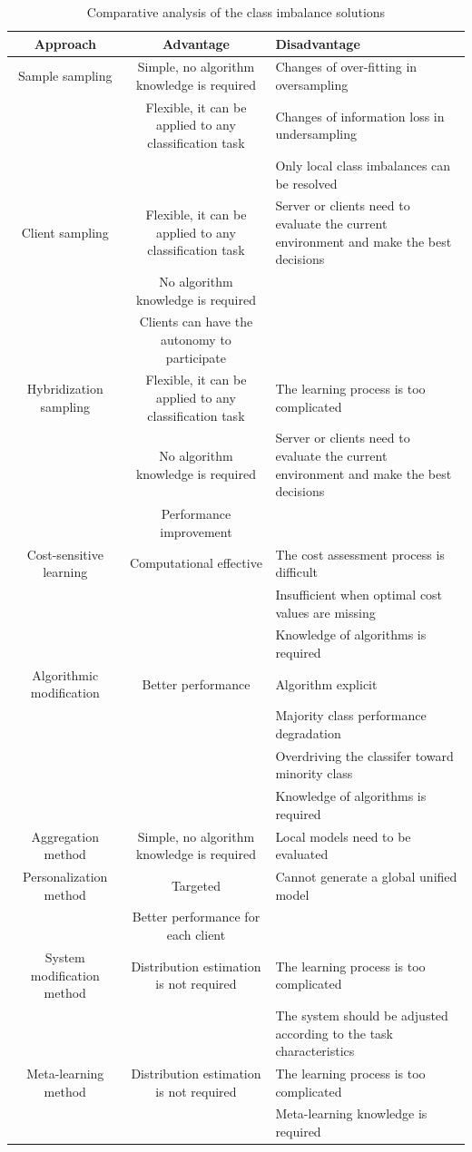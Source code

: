 \documentclass[10pt,journal,compsoc]{IEEEtran}
\begin{document}
\begin{table}[!t]
\centering
\caption{Comparative analysis of the class imbalance solutions}	     
\label{analysis}  		       	
\begin{tabular}{cc p{6cm}}
	\hline
	Approach& Advantage&Disadvantage \\ 
	\hline
	Sample sampling&Simple, no algorithm knowledge is required&Changes of over-fitting in oversampling\\
	&Flexible, it can be applied to any classification task&Changes of information loss in undersampling\\ 
	&&Only local class imbalances can be resolved\\ \hline
	Client sampling&Flexible, it can be applied to any classification task&Server or clients need to evaluate the current environment and make the best decisions\\
	&No algorithm knowledge is required&\\ 
	&Clients can have the autonomy to participate& \\ \hline
	Hybridization sampling&Flexible, it can be applied to any classification task&The learning process is too complicated\\
	&No algorithm knowledge is required&Server or clients need to evaluate the current environment and make the best decisions\\ 
	&Performance improvement&\\
	\hline
	Cost-sensitive learning&Computational effective &The cost assessment process is difficult\\
	&&Insufficient when optimal cost values are missing\\ 
	&&Knowledge of algorithms is required\\
	\hline
	Algorithmic modification&Better performance&Algorithm explicit\\ 
	&&Majority class performance degradation\\ 
	&&Overdriving the classifer toward minority	class\\ 
	&&Knowledge of algorithms is required\\ \hline
	Aggregation method&Simple, no algorithm knowledge is required&Local models need to be evaluated\\ \hline
	Personalization method&Targeted&Cannot generate a global unified model\\
	&Better performance for each client &                             \\ \hline
	System modification method&Distribution estimation is not required&The learning process is too complicated\\
	&&The system should be adjusted according to the task characteristics\\ \hline
	Meta-learning method&Distribution estimation is not required&The learning process is too complicated\\ 
	&&Meta-learning knowledge is required\\
	\hline
\end{tabular}
\end{table}
\vspace{-0.2cm}
\end{document}
